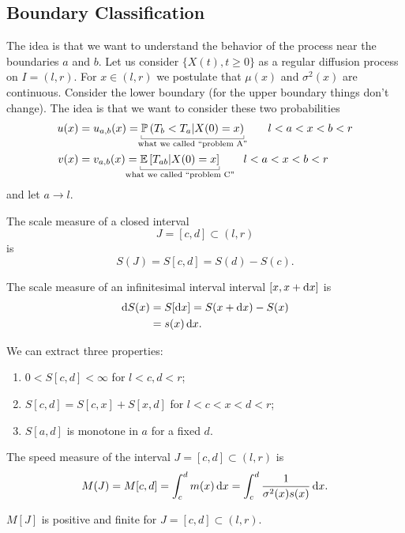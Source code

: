 \documentclass[12pt]{report}
\begin{document}
\subsection{Boundary Classification}
The idea is that we want to understand the behavior of the process near the boundaries $a$ and $b$. Let us consider $\{X(t),t\geq0\}$ as a regular diffusion process on $I=(l,r)$. For $x\in(l,r)$ we postulate that $\mu(x)$ and $\sigma^{2}(x)$ are continuous. Consider the lower boundary (for the upper boundary things don't change). The idea is that we want to consider these two probabilities
\begin{align*}
	u(x)&=u_{a,b}(x)=\ubracketthin{\pr\left(T_{b}<T_{a}|X(0)=x\right)}_{\claptext{what we called ``problem A''}}\qquad l<a<x<b<r\\
	v(x)&=v_{a,b}(x)=\ubracketthin{\ev{T_{ab}|X(0)=x}}_{\claptext{what we called ``problem C''}}\qquad l<a<x<b<r
\end{align*}
and let $a\to l$.
\begin{definition}
	The scale measure of a closed interval 
	\begin{equation*}
		J=[c,d]\subset(l,r)
	\end{equation*}
	is
	\begin{equation*}
		S(J)=S[c,d]=S(d)-S(c).
	\end{equation*}
\end{definition}
\begin{definition}
	The scale measure of an infinitesimal interval interval $[x,x+\mathop{}\!\mathrm{d} x]$
	is
	\begin{align*}
		\mathop{}\!\mathrm{d} S(x)&=S[\mathop{}\!\mathrm{d} x]=S(x+\mathop{}\!\mathrm{d} x)-S(x)\\
		&=s(x)\mathop{}\!\mathrm{d} x.
	\end{align*}
\end{definition}
We can extract three properties:
\begin{enumerate}
	\item $0<S[c,d]<\infty$ for $l<c,d<r$;
	\item $S[c,d]=S[c,x]+S[x,d]$ for $l<c<x<d<r$;
	\item $S[a,d]$ is monotone in $a$ for a fixed $d$.
\end{enumerate}
\begin{definition}
	The speed measure of the interval $J=[c,d]\subset(l,r)$ is
	\begin{equation*}
		M(J)=M[c,d]=\int_{c}^{d}m(x)\mathop{}\!\mathrm{d} x=\int_{c}^{d}\frac{1}{\sigma^{2}(x)s(x)}\mathop{}\!\mathrm{d} x.
	\end{equation*}
\end{definition}
$M[J]$ is positive and finite for $J=[c,d]\subset(l,r)$.
\end{document}
